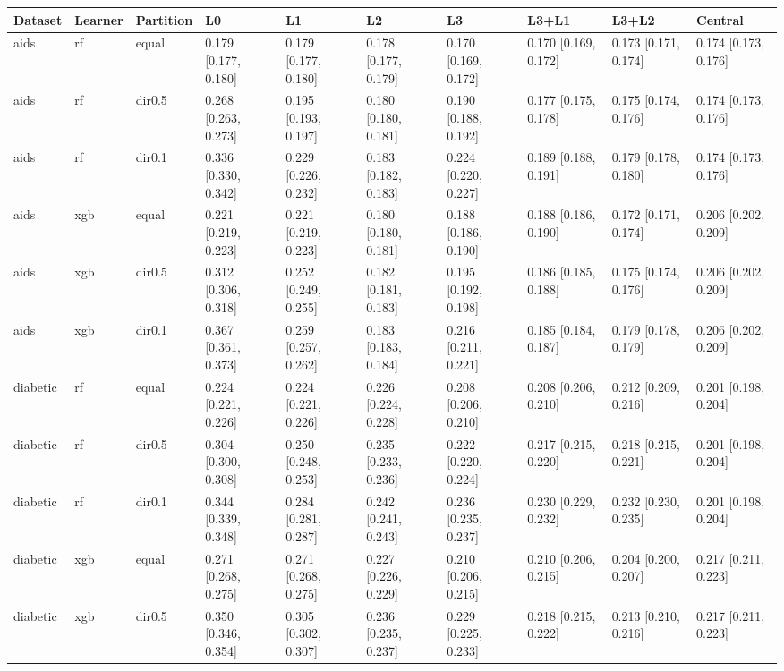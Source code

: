 \begin{tabular}{llllllllll}
\toprule
Dataset & Learner & Partition & L0 & L1 & L2 & L3 & L3+L1 & L3+L2 & Central \\
\midrule
aids & rf & equal & 0.179 [0.177, 0.180] & 0.179 [0.177, 0.180] & 0.178 [0.177, 0.179] & 0.170 [0.169, 0.172] & 0.170 [0.169, 0.172] & 0.173 [0.171, 0.174] & 0.174 [0.173, 0.176] \\
aids & rf & dir0.5 & 0.268 [0.263, 0.273] & 0.195 [0.193, 0.197] & 0.180 [0.180, 0.181] & 0.190 [0.188, 0.192] & 0.177 [0.175, 0.178] & 0.175 [0.174, 0.176] & 0.174 [0.173, 0.176] \\
aids & rf & dir0.1 & 0.336 [0.330, 0.342] & 0.229 [0.226, 0.232] & 0.183 [0.182, 0.183] & 0.224 [0.220, 0.227] & 0.189 [0.188, 0.191] & 0.179 [0.178, 0.180] & 0.174 [0.173, 0.176] \\
aids & xgb & equal & 0.221 [0.219, 0.223] & 0.221 [0.219, 0.223] & 0.180 [0.180, 0.181] & 0.188 [0.186, 0.190] & 0.188 [0.186, 0.190] & 0.172 [0.171, 0.174] & 0.206 [0.202, 0.209] \\
aids & xgb & dir0.5 & 0.312 [0.306, 0.318] & 0.252 [0.249, 0.255] & 0.182 [0.181, 0.183] & 0.195 [0.192, 0.198] & 0.186 [0.185, 0.188] & 0.175 [0.174, 0.176] & 0.206 [0.202, 0.209] \\
aids & xgb & dir0.1 & 0.367 [0.361, 0.373] & 0.259 [0.257, 0.262] & 0.183 [0.183, 0.184] & 0.216 [0.211, 0.221] & 0.185 [0.184, 0.187] & 0.179 [0.178, 0.179] & 0.206 [0.202, 0.209] \\
\addlinespace
diabetic & rf & equal & 0.224 [0.221, 0.226] & 0.224 [0.221, 0.226] & 0.226 [0.224, 0.228] & 0.208 [0.206, 0.210] & 0.208 [0.206, 0.210] & 0.212 [0.209, 0.216] & 0.201 [0.198, 0.204] \\
diabetic & rf & dir0.5 & 0.304 [0.300, 0.308] & 0.250 [0.248, 0.253] & 0.235 [0.233, 0.236] & 0.222 [0.220, 0.224] & 0.217 [0.215, 0.220] & 0.218 [0.215, 0.221] & 0.201 [0.198, 0.204] \\
diabetic & rf & dir0.1 & 0.344 [0.339, 0.348] & 0.284 [0.281, 0.287] & 0.242 [0.241, 0.243] & 0.236 [0.235, 0.237] & 0.230 [0.229, 0.232] & 0.232 [0.230, 0.235] & 0.201 [0.198, 0.204] \\
diabetic & xgb & equal & 0.271 [0.268, 0.275] & 0.271 [0.268, 0.275] & 0.227 [0.226, 0.229] & 0.210 [0.206, 0.215] & 0.210 [0.206, 0.215] & 0.204 [0.200, 0.207] & 0.217 [0.211, 0.223] \\
diabetic & xgb & dir0.5 & 0.350 [0.346, 0.354] & 0.305 [0.302, 0.307] & 0.236 [0.235, 0.237] & 0.229 [0.225, 0.233] & 0.218 [0.215, 0.222] & 0.213 [0.210, 0.216] & 0.217 [0.211, 0.223] \\

\end{tabular}
